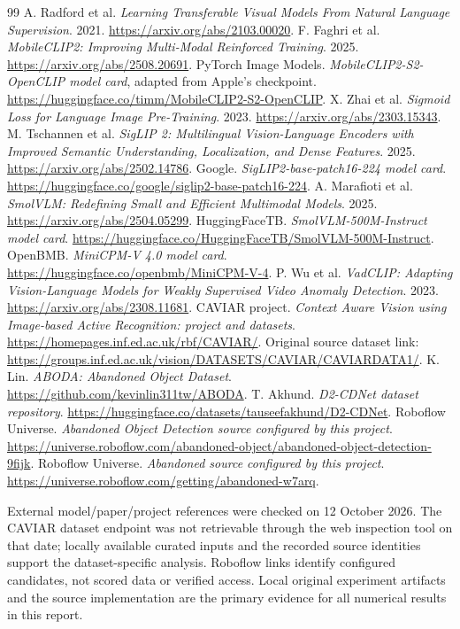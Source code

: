 \documentclass[11pt,a4paper]{article}
\begin{document}
\clearpage
\begin{thebibliography}{99}
 A. Radford et al. \emph{Learning Transferable Visual Models From Natural Language Supervision}. 2021. \url{https://arxiv.org/abs/2103.00020}.
 F. Faghri et al. \emph{MobileCLIP2: Improving Multi-Modal Reinforced Training}. 2025. \url{https://arxiv.org/abs/2508.20691}.
 PyTorch Image Models. \emph{MobileCLIP2-S2-OpenCLIP model card}, adapted from Apple's checkpoint. \url{https://huggingface.co/timm/MobileCLIP2-S2-OpenCLIP}.
 X. Zhai et al. \emph{Sigmoid Loss for Language Image Pre-Training}. 2023. \url{https://arxiv.org/abs/2303.15343}.
 M. Tschannen et al. \emph{SigLIP 2: Multilingual Vision-Language Encoders with Improved Semantic Understanding, Localization, and Dense Features}. 2025. \url{https://arxiv.org/abs/2502.14786}.
 Google. \emph{SigLIP2-base-patch16-224 model card}. \url{https://huggingface.co/google/siglip2-base-patch16-224}.
 A. Marafioti et al. \emph{SmolVLM: Redefining Small and Efficient Multimodal Models}. 2025. \url{https://arxiv.org/abs/2504.05299}.
 HuggingFaceTB. \emph{SmolVLM-500M-Instruct model card}. \url{https://huggingface.co/HuggingFaceTB/SmolVLM-500M-Instruct}.
 OpenBMB. \emph{MiniCPM-V 4.0 model card}. \url{https://huggingface.co/openbmb/MiniCPM-V-4}.
 P. Wu et al. \emph{VadCLIP: Adapting Vision-Language Models for Weakly Supervised Video Anomaly Detection}. 2023. \url{https://arxiv.org/abs/2308.11681}.
 CAVIAR project. \emph{Context Aware Vision using Image-based Active Recognition: project and datasets}. \url{https://homepages.inf.ed.ac.uk/rbf/CAVIAR/}. Original source dataset link: \url{https://groups.inf.ed.ac.uk/vision/DATASETS/CAVIAR/CAVIARDATA1/}.
 K. Lin. \emph{ABODA: Abandoned Object Dataset}. \url{https://github.com/kevinlin311tw/ABODA}.
 T. Akhund. \emph{D2-CDNet dataset repository}. \url{https://huggingface.co/datasets/tauseefakhund/D2-CDNet}.
 Roboflow Universe. \emph{Abandoned Object Detection source configured by this project}. \url{https://universe.roboflow.com/abandoned-object/abandoned-object-detection-9fijk}.
 Roboflow Universe. \emph{Abandoned source configured by this project}. \url{https://universe.roboflow.com/getting/abandoned-w7arq}.
\end{thebibliography}
External model/paper/project references were checked on 12 October 2026. The CAVIAR dataset endpoint was not retrievable through the web inspection tool on that date; locally available curated inputs and the recorded source identities support the dataset-specific analysis. Roboflow links identify configured candidates, not scored data or verified access. Local original experiment artifacts and the source implementation are the primary evidence for all numerical results in this report.
\end{document}
